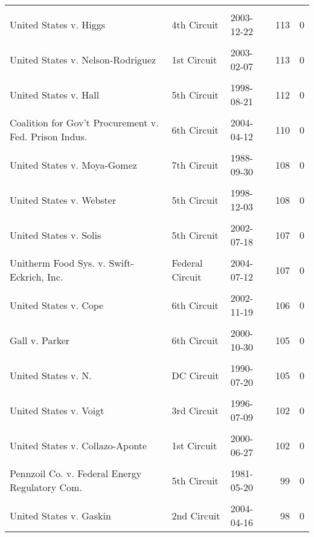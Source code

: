 \documentclass[10pt, letterpaper]{article}
\begin{document}
\begin{spacing}{1.0}
\begin{footnotesize}
\begin{longtable}[H]{p{3.5in}llrr}
        & & & &\\[-6pt]
        United States v. Higgs & 4th Circuit & 2003-12-22 & 113 & 0\\
        & & & &\\[-6pt]
        United States v. Nelson-Rodriguez & 1st Circuit & 2003-02-07 & 113 & 0\\
        & & & &\\[-6pt]
        United States v. Hall & 5th Circuit & 1998-08-21 & 112 & 0\\
        & & & &\\[-6pt]
        Coalition for Gov't Procurement v. Fed. Prison Indus. & 6th Circuit & 2004-04-12 & 110 & 0\\
        & & & &\\[-6pt]
        United States v. Moya-Gomez & 7th Circuit & 1988-09-30 & 108 & 0\\
        & & & &\\[-6pt]
        United States v. Webster & 5th Circuit & 1998-12-03 & 108 & 0\\
        & & & &\\[-6pt]
        United States v. Solis & 5th Circuit & 2002-07-18 & 107 & 0\\
        & & & &\\[-6pt]
        Unitherm Food Sys. v. Swift-Eckrich, Inc. & Federal Circuit & 2004-07-12 & 107 & 0\\
        & & & &\\[-6pt]
        United States v. Cope & 6th Circuit & 2002-11-19 & 106 & 0\\
        & & & &\\[-6pt]
        Gall v. Parker & 6th Circuit & 2000-10-30 & 105 & 0\\
        & & & &\\[-6pt]
        United States v. N. & DC Circuit & 1990-07-20 & 105 & 0\\
        & & & &\\[-6pt]
        United States v. Voigt & 3rd Circuit & 1996-07-09 & 102 & 0\\
        & & & &\\[-6pt]
        United States v. Collazo-Aponte & 1st Circuit & 2000-06-27 & 102 & 0\\
        & & & &\\[-6pt]
        Pennzoil Co. v. Federal Energy Regulatory Com. & 5th Circuit & 1981-05-20 & 99 & 0\\
        & & & &\\[-6pt]
        United States v. Gaskin & 2nd Circuit & 2004-04-16 & 98 & 0\\

\end{longtable}
\end{footnotesize}
\end{spacing}
\end{document}
